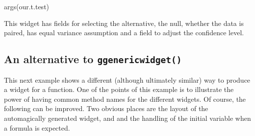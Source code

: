 \documentclass[12pt]{article}
\newcommand{\RFunc}[1]{\texttt{#1()}}
\begin{document}
\begin{Scode}
args(our.t.test)
\end{Scode}

This widget has fields for selecting the alternative, the null,
whether the data is paired, has equal variance assumption and a field
to adjust the confidence level.

\subsection{An alternative to \RFunc{ggenericwidget}}
\label{sec:an-altern-ggenericwidget}

This next example shows a different (although ultimately similar) way
to produce a widget for a function. One of the points of this example
is to illustrate the power of having common method names for the
different widgets. Of course, the following can be improved. Two obvious
places are the layout of the automagically generated widget, and and
the handling of the initial variable when a formula is expected.
 
\end{document}
